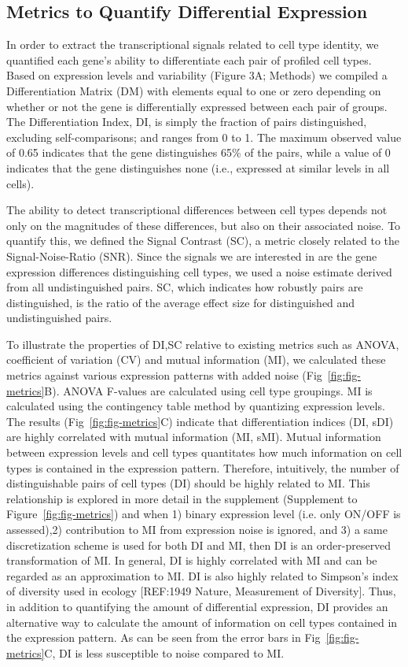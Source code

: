 \subsection{Metrics to Quantify Differential Expression}
In order to extract the transcriptional signals related to cell type identity, we quantified each gene's ability to differentiate each pair of profiled cell types. Based on expression levels and variability (Figure 3A; Methods) we compiled a Differentiation Matrix (DM) with elements equal to one or zero depending on whether or not the gene is differentially expressed between each pair of groups. The Differentiation Index, DI, is simply the fraction of pairs distinguished, excluding self-comparisons; and ranges from 0 to 1. The maximum observed value of 0.65 indicates that the gene distinguishes 65\% of the pairs, while a value of 0 indicates that the gene distinguishes none (i.e., expressed at similar levels in all cells). 

The ability to detect transcriptional differences between cell types depends not only on the magnitudes of these differences, but also on their associated noise. To quantify this, we defined the Signal Contrast (SC), a metric closely related to the Signal-Noise-Ratio (SNR). Since the signals we are interested in are the gene expression differences distinguishing cell types, we used a noise estimate derived from all undistinguished pairs. SC, which indicates how robustly pairs are distinguished, is the ratio of the average effect size for distinguished and undistinguished pairs. 

To illustrate the properties of DI,SC relative to existing metrics such as ANOVA, coefficient of variation (CV) and mutual information (MI), we calculated these metrics against various expression patterns with added noise (Fig~\ref{fig:fig-metrics}B). ANOVA F-values are calculated using cell type groupings. MI is calculated using the contingency table method by quantizing expression levels. 
The results (Fig~\ref{fig:fig-metrics}C) indicate that differentiation indices (DI, sDI) are highly correlated with mutual information (MI, sMI). Mutual information between expression levels and cell types quantitates how much information on cell types is contained in the expression pattern. Therefore, intuitively, the number of distinguishable pairs of cell types (DI) should be highly related to MI. This relationship is explored in more detail in the supplement (Supplement to Figure~\ref{fig:fig-metrics}) and when 1) binary expression level (i.e. only ON/OFF is assessed),2) contribution to MI from expression noise is ignored, and 3) a same discretization scheme is used for both DI and MI, then DI is an order-preserved transformation of MI. In general, DI is highly correlated with MI and can be regarded as an approximation to MI. DI is also highly related to Simpson's index of diversity used in ecology [REF:1949 Nature, Measurement of Diversity]. Thus, in addition to quantifying the amount of differential expression, DI provides an alternative way to calculate the amount of information on cell types contained in the expression pattern. As can be seen from the error bars in Fig~\ref{fig:fig-metrics}C, DI is less susceptible to noise compared to MI. 

